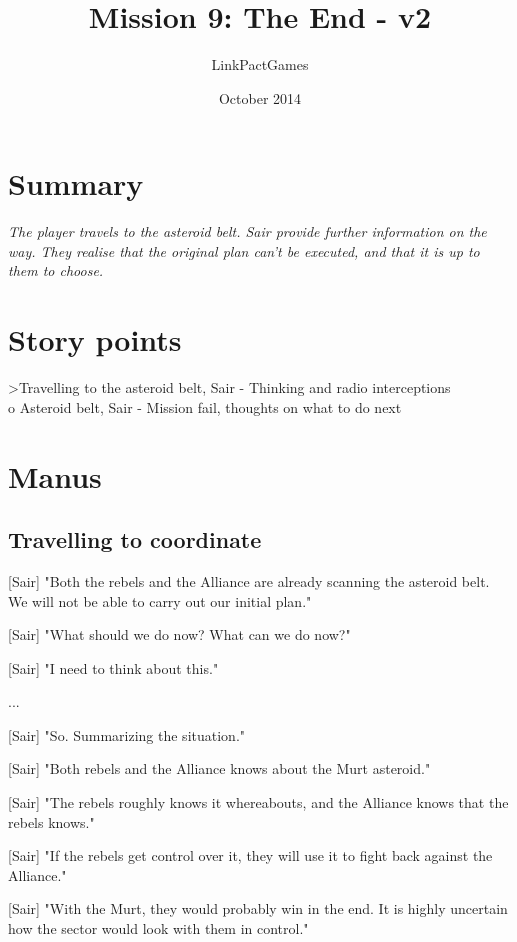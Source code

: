 \documentclass[a4paper,12pt]{article}
\begin{document}
\title{Mission 9: The End - v2}
\author{LinkPactGames}
\date{October 2014}
\maketitle

\section{Summary}

\textit{The player travels to the asteroid belt. Sair provide further information on the way.
They realise that the original plan can't be executed, and that it is up to them to choose.}

\section{Story points}

\textgreater Travelling to the asteroid belt, Sair - Thinking and radio interceptions\\
o Asteroid belt, Sair - Mission fail, thoughts on what to do next

\section{Manus}

\subsection{Travelling to coordinate}

[Sair] "Both the rebels and the Alliance are already scanning the asteroid belt. We will not be
able to carry out our initial plan."

[Sair] "What should we do now? What can we do now?" 

[Sair] "I need to think about this."

...

[Sair] "So. Summarizing the situation."

[Sair] "Both rebels and the Alliance knows about the Murt asteroid."

[Sair] "The rebels roughly knows it whereabouts, and the Alliance knows that the rebels knows."

[Sair] "If the rebels get control over it, they will use it to fight back against the Alliance."

[Sair] "With the Murt, they would probably win in the end. It is highly uncertain how the sector would look with them in control."
\end{document}
